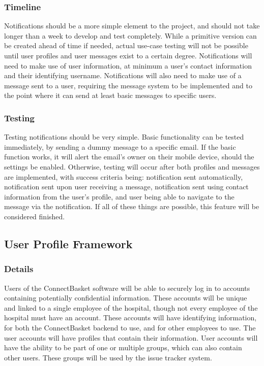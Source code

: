 \documentclass[onecolumn, draftclsnofoot,10pt, compsoc]{IEEEtran}
\begin{document}
\subsubsection{Timeline}
Notifications should be a more simple element to the project, and should not take longer than a week to develop and test completely. While a primitive version can be created ahead of time if needed, actual use-case testing will not be possible until user profiles and user messages exist to a certain degree. Notifications will need to make use of user information, at minimum a user's contact information and their identifying username. Notifications will also need to make use of a message sent to a user, requiring the message system to be implemented and to the point where it can send at least basic messages to specific users.


\subsubsection{Testing}
Testing notifications should be very simple. Basic functionality can be tested immediately, by sending a dummy message to a specific email. If the basic function works, it will alert the email's owner on their mobile device, should the settings be enabled. Otherwise, testing will occur after both profiles and messages are implemented, with success criteria being: notification sent automatically, notification sent upon user receiving a message, notification sent using contact information from the user's profile, and user being able to navigate to the message via the notification. If all of these things are possible, this feature will be considered finished.


\subsection{User Profile Framework}


\subsubsection{Details}
Users of the ConnectBasket software will be able to securely log in to accounts containing potentially confidential information. These accounts will be unique and linked to a single employee of the hospital, though not every employee of the hospital must have an account. These accounts will have identifying information, for both the ConnectBasket backend to use, and for other employees to use. The user accounts will have profiles that contain their information. User accounts will have the ability to be part of one or multiple groups, which can also contain other users. These groups will be used by the issue tracker system.
\end{document}
